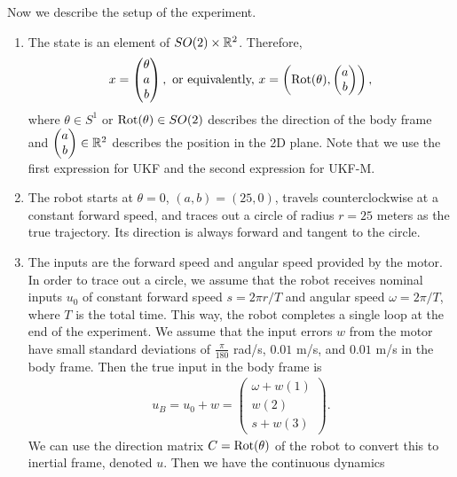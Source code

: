 \documentclass[12pt]{article}
\begin{document}
Now we describe the setup of the experiment. 
\begin{enumerate}[label=(\arabic*)]
	\item The state is an element of $ SO(2) \times \mathbb{R}^2$. Therefore, 
		\begin{align*}
			x = \begin{pmatrix} \theta\\ a \\ b \end{pmatrix}, \text{ or equivalently, } x = \left( \operatorname{Rot}(\theta), \begin{pmatrix} a\\b \end{pmatrix}  \right)  ,
		\end{align*}
		where $ \theta \in S^{1}$ or $ \operatorname{Rot}(\theta) \in SO(2)$ describes the direction of the body frame and $ \begin{pmatrix} a\\b \end{pmatrix} \in \mathbb{R}^2$ describes the position in the 2D plane. Note that we use the first expression for UKF and the second expression for UKF-M.
	\item The robot starts at $ \theta = 0$, $ (a,b) = (25,0)$, travels counterclockwise at a constant forward speed, and traces out a circle of radius $ r=25$ meters as the true trajectory. Its direction is always forward and tangent to the circle.
	\item The inputs are the forward speed and angular speed provided by the motor. In order to trace out a circle, we assume that the robot receives nominal inputs $ u_0$ of constant forward speed $ s = 2\pi r /T$ and angular speed $ \omega = 2\pi /T$, where  $ T$ is the total time. This way, the robot completes a single loop at the end of the experiment. We assume that the input errors $ w$ from the motor have small standard deviations of $\frac{\pi}{180}$ rad/s, $0.01$ m/s, and $0.01$ m/s in the body frame. Then the true input in the body frame is 
		\begin{align*}
			u_B = u_0 + w = \begin{pmatrix} \omega + w(1) \\ w(2)\\ s+w(3) \end{pmatrix} .
		\end{align*}
		We can use the direction matrix $ C = \operatorname{Rot}(\theta)$ of the robot to convert this to inertial frame, denoted $ u$. Then we have the continuous dynamics
		\begin{align*}

\end{align*}
\end{enumerate}
\end{document}
